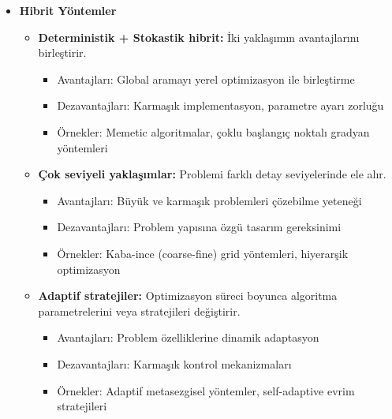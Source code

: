 \begin{itemize}
    \item \textbf{Hibrit Yöntemler} 
        \begin{itemize}
            \item \textbf{Deterministik + Stokastik hibrit:} İki yaklaşımın avantajlarını birleştirir.
                \begin{itemize}
                    \item Avantajları: Global aramayı yerel optimizasyon ile birleştirme
                    \item Dezavantajları: Karmaşık implementasyon, parametre ayarı zorluğu
                    \item Örnekler: Memetic algoritmalar, çoklu başlangıç noktalı gradyan yöntemleri
                \end{itemize}
                
            \item \textbf{Çok seviyeli yaklaşımlar:} Problemi farklı detay seviyelerinde ele alır.
                \begin{itemize}
                    \item Avantajları: Büyük ve karmaşık problemleri çözebilme yeteneği
                    \item Dezavantajları: Problem yapısına özgü tasarım gereksinimi
                    \item Örnekler: Kaba-ince (coarse-fine) grid yöntemleri, hiyerarşik optimizasyon
                \end{itemize}
                
            \item \textbf{Adaptif stratejiler:} Optimizasyon süreci boyunca algoritma parametrelerini veya stratejileri değiştirir.
                \begin{itemize}
                    \item Avantajları: Problem özelliklerine dinamik adaptasyon
                    \item Dezavantajları: Karmaşık kontrol mekanizmaları
                    \item Örnekler: Adaptif metasezgisel yöntemler, self-adaptive evrim stratejileri  
                \end{itemize}
        \end{itemize}
\end{itemize} 

